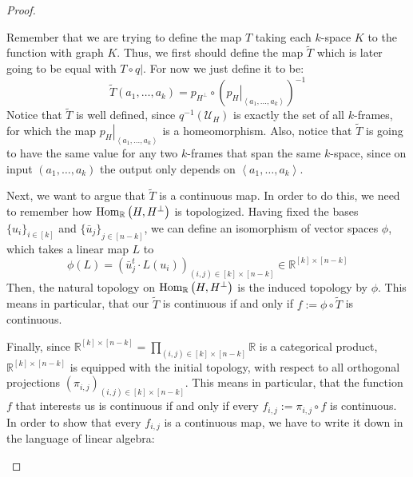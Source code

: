 \begin{proof}
\begin{b_item}
Remember that we are trying to define the map $T$ taking each $k$-space $K$ to the function with graph $K$. Thus, we first should define the map $\tilde T$ which is later going to be equal with $T\circ\left.q\right|$. For now we just define it to be:
\[\tilde T(a_1,\ldots,a_k)=p_{H^{\perp}}\circ{\left(\left.p_H\right|_{\left<a_1,\ldots,a_k\right>}\right)}^{-1}\]
Notice that $\tilde T$ is well defined, since $q^{-1}\left(\mathcal{U}_H\right)$ is exactly the set of all $k$-frames, for which the map $\left.p_H\right|_{\left<a_1,\ldots,a_k\right>}$ is a homeomorphism. Also, notice that $\tilde T$ is going to have the same value for any two $k$-frames that span the same $k$-space, since on input $(a_1,\ldots,a_k)$ the output only depends on $\left<a_1,\ldots,a_k\right>$.

Next, we want to argue that $\tilde T$ is a continuous map. In order to do this, we need to remember how $\mathrm{Hom}_{\mathbb{R}}\left(H,H^{\perp}\right)$ is topologized. Having fixed the bases ${\{u_i\}}_{i\in[k]}$ and ${\{\bar{u}_j\}}_{j\in[n-k]}$, we can define an isomorphism of vector spaces $\phi$, which takes a linear map $L$ to
\[\phi(L)={\left(\bar{u}_j^t\cdot L(u_i)\right)}_{(i,j)\in[k]\times[n-k]}\in\mathbb{R}^{[k]\times[n-k]}\]
Then, the natural topology on $\mathrm{Hom}_{\mathbb{R}}\left(H,H^{\perp}\right)$ is the induced topology by $\phi$. This means in particular, that our $\tilde T$ is continuous if and only if $f:=\phi\circ\tilde T$ is continuous.

Finally, since $\mathbb{R}^{[k]\times[n-k]}=\prod_{(i,j)\in[k]\times[n-k]}\mathbb{R}$ is a categorical product, $\mathbb{R}^{[k]\times[n-k]}$ is equipped with the initial topology, with respect to all orthogonal projections ${\left(\pi_{i,j}\right)}_{(i,j)\in[k]\times[n-k]}$. This means in particular, that the function $f$ that interests us is continuous if and only if every $f_{i,j}:=\pi_{i,j}\circ f$ is continuous. In order to show that every $f_{i,j}$ is a continuous map, we have to write it down in the language of linear algebra:


\end{b_item}
\end{proof}
